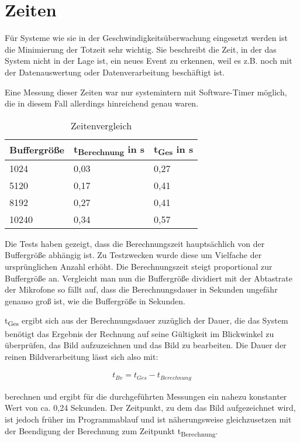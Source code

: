 \section{Zeiten}

Für Systeme wie sie in der Geschwindigkeitsüberwachung eingesetzt werden ist die Minimierung der Totzeit sehr wichtig. Sie beschreibt die Zeit, in der das System nicht in der Lage ist, ein neues Event zu erkennen, weil es z.B. noch mit der Datenauswertung oder Datenverarbeitung beschäftigt ist.

Eine Messung dieser Zeiten war nur systemintern mit Software-Timer möglich, die in diesem Fall allerdings hinreichend genau waren.

\begin{table}[h]
\centering
\begin{tabular}[h]{|l|l|l|}
	\hline
	Buffergröße & t\textsubscript{Berechnung} in s & t\textsubscript{Ges} in s \\
	\hline
	1024 & 0,03 & 0,27\\
	\hline
	5120 & 0,17 & 0,41\\
	\hline
	8192 & 0,27 & 0,41\\
	\hline
	10240 & 0,34 & 0,57\\
	\hline	
\end{tabular}
\caption{Zeitenvergleich}
\label{tab:Zeitenvergleich}
\end{table}

Die Tests haben gezeigt, dass die Berechnungszeit hauptsächlich von der Buffergröße abhängig ist. Zu Testzwecken wurde diese um Vielfache der ursprünglichen Anzahl erhöht. Die Berechnungszeit steigt proportional zur Buffergröße an. Vergleicht man nun die Buffergröße dividiert mit der Abtastrate der Mikrofone so fällt auf, dass die Berechnungsdauer in Sekunden ungefähr genauso groß ist, wie die Buffergröße in Sekunden. 

t\textsubscript{Ges} ergibt sich aus der Berechnungsdauer zuzüglich der Dauer, die das System benötigt das Ergebnis der Rechnung auf seine Gültigkeit im Blickwinkel zu überprüfen, das Bild aufzuzeichnen und das Bild zu bearbeiten. Die Dauer der reinen Bildverarbeitung lässt sich also mit:

\begin{equation}
	\begin{aligned}
		t_{Bv} = t_{Ges} - t_{Berechnung}
	\end{aligned}
	\nonumber
\end{equation}

berechnen und ergibt für die durchgeführten Messungen ein nahezu konstanter Wert von ca. 0,24 Sekunden. Der Zeitpunkt, zu dem das Bild aufgezeichnet wird, ist jedoch früher im Programmablauf und ist näherungsweise gleichzusetzen mit der Beendigung der Berechnung zum Zeitpunkt t\textsubscript{Berechnung}. 

\newpage